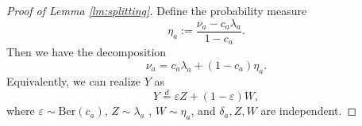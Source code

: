 \documentclass[10pt,a4paper]{amsart}
\newcommand{\ep}{\varepsilon}
\begin{document}
\begin{proof} [Proof of Lemma \ref{lm:splitting}]
 	\medskip
 	
 	Define the probability measure
 	\[
 	\eta_a := \frac{\nu_a - c_a \lambda_a}{1 - c_a}.
 	\]
 	Then we have the decomposition
 	\[
 	\nu_a = c_a \lambda_a + (1-c_a)\eta_a.
 	\]
 	Equivalently, we can realize $Y$ as
 	\[
 	Y \overset{d}{=} \ep Z + (1-\ep) W,
 	\]
 	where $\ep  \sim \mathrm{Ber}(c_a)$, $Z \sim \lambda_a$ , $W \sim \eta_a$, and $\delta_a, Z, W$ are independent.
 \end{proof}
\end{document}
